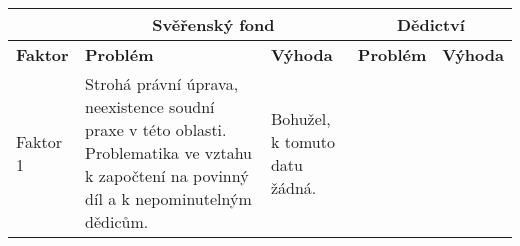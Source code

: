 \documentclass{article}
\begin{document}
\noindent\begin{tabularx}{\textwidth}{X|X|X|X|X|}
\cline{2-5}
                               & \multicolumn{2}{c|}{Svěřenský fond} & \multicolumn{2}{c|}{Dědictví} \\ \hline
\multicolumn{1}{|l|}{\textbf{Faktor}}   & \textbf{Problém}           & \textbf{Výhoda}          & \textbf{Problém}        & \textbf{Výhoda}       \\ \hline
\multicolumn{1}{|l|}{Faktor 1} &         


Strohá právní úprava, neexistence soudní praxe v této oblasti.
Problematika ve vztahu k započtení na povinný díl a k nepominutelným dědicům.


&      Bohužel, k tomuto datu žádná.  



\end{tabularx}
\end{document}

